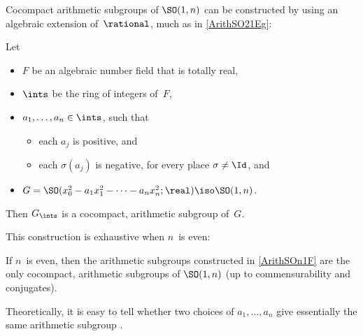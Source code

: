 Cocompact arithmetic subgroups of $\SO(1,n)$ can be constructed by using an algebraic extension of~$\rational$, much as in \cref{ArithSO21Eg}:

\begin{prop} \label{ArithSOn1F}
\noprelistbreak
 Let
 \begin{itemize}
 \item $F$ be an algebraic number field that is totally
real,
 \item $\ints$ be the ring of integers of~$F$,
 \item $a_1,\ldots,a_n \in \ints$, such that 
 \begin{itemize}
 \item each $a_j$ is positive, and
 \item each $\sigma(a_j)$ is negative, for every place
$\sigma \neq \Id$,
and
 \end{itemize}
 \item $G = \SO(x_0^2 - a_1 x_1^2 - \cdots - a_n x_n^2;
\real) \iso \SO(1,n)$.
 \end{itemize}
 Then $G_{\ints}$ is a cocompact, arithmetic
subgroup of~$G$.
 \end{prop}

This construction is exhaustive when $n$~is even:

\begin{prop} \label{SO1nCpctListStated}
 If $n$~is even, then the arithmetic subgroups constructed in
\cref{ArithSOn1F} are the only cocompact, arithmetic subgroups of\/
$\SO(1,n)$ \textup(up to commensurability and
conjugates\textup).
 \end{prop}

\begin{rem}
 Theoretically, it is easy to tell whether two choices of
$a_1,\ldots,a_n$ give essentially the same arithmetic subgroup
.
\end{rem}

